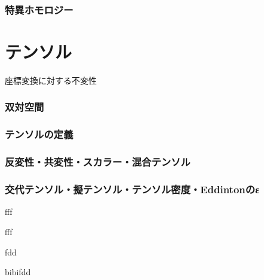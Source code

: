 \documentclass[uplatex]{jsarticle}
\newcommand{\octopuspart}[1]{\newpage\part{#1}\setcounter{section}{0}\vspace{3\baselineskip}}
\begin{document}
\section{特異ホモロジー}

\octopuspart{テンソル}
座標変換に対する不変性

\section{双対空間}
\section{テンソルの定義}
\section{反変性・共変性・スカラー・混合テンソル}
\section{交代テンソル・擬テンソル・テンソル密度・Eddintonのε}


\begin{teigi}
    fff
\end{teigi}

\begin{teiri}
    fff
\end{teiri}

\begin{hodai}
\end{hodai}

\begin{rei}
    fdd
\end{rei}
bibifdd
\end{document}
